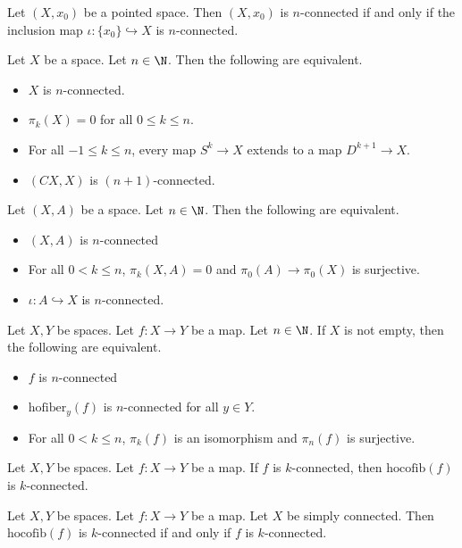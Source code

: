 \documentclass[a4paper]{article}
\begin{document}
\begin{lmm}{}{} Let $(X,x_0)$ be a pointed space. Then $(X,x_0)$ is $n$-connected if and only if the inclusion map $\iota:\{x_0\}\hookrightarrow X$ is $n$-connected. 
\end{lmm}

\begin{prp}{}{} Let $X$ be a space. Let $n\in\N$. Then the following are equivalent. 
\begin{itemize}
\item $X$ is $n$-connected. 
\item $\pi_k(X)=0$ for all $0\leq k\leq n$. 
\item For all $-1\leq k\leq n$, every map $S^k\to X$ extends to a map $D^{k+1}\to X$. 
\item $(CX,X)$ is $(n+1)$-connected. 
\end{itemize}
\end{prp}

\begin{prp}{}{} Let $(X,A)$ be a space. Let $n\in\N$. Then the following are equivalent. 
\begin{itemize}
\item $(X,A)$ is $n$-connected
\item For all $0<k\leq n$, $\pi_k(X,A)=0$ and $\pi_0(A)\to\pi_0(X)$ is surjective. 
\item $\iota:A\hookrightarrow X$ is $n$-connected. 
\end{itemize}
\end{prp}

\begin{prp}{}{} Let $X,Y$ be spaces. Let $f:X\to Y$ be a map. Let $n\in\N$. If $X$ is not empty, then the following are equivalent. 
\begin{itemize}
\item $f$ is $n$-connected
\item $\text{hofiber}_y(f)$ is $n$-connected for all $y\in Y$. 
\item For all $0<k\leq n$, $\pi_k(f)$ is an isomorphism and $\pi_n(f)$ is surjective. 
\end{itemize}
\end{prp}

\begin{prp}{}{} Let $X,Y$ be spaces. Let $f:X\to Y$ be a map. If $f$ is $k$-connected, then $\text{hocofib}(f)$ is $k$-connected. 
\end{prp}

\begin{prp}{}{} Let $X,Y$ be spaces. Let $f:X\to Y$ be a map. Let $X$ be simply connected. Then $\text{hocofib}(f)$ is $k$-connected if and only if $f$ is $k$-connected. 
\end{prp}
\end{document}
